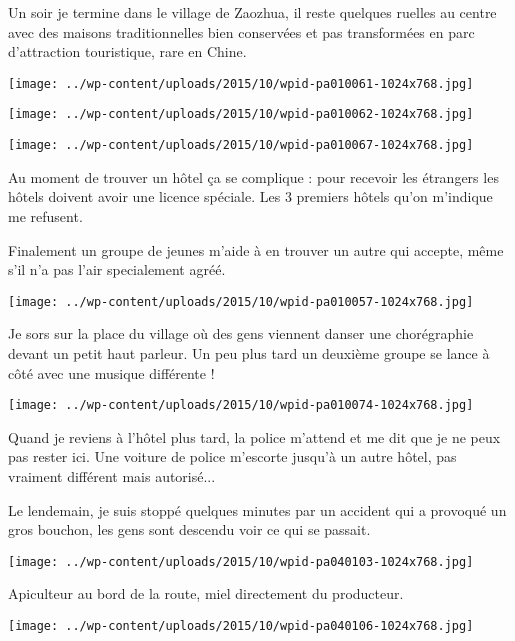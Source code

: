 \pagebreak
 Un soir je termine dans le village de Zaozhua, il reste quelques ruelles au centre avec des maisons traditionnelles bien conservées et pas transformées en parc d'attraction touristique, rare en Chine. 
\begin{center} \texttt{[image: ../wp-content/uploads/2015/10/wpid-pa010061-1024x768.jpg]} \end{center}
\begin{center} \texttt{[image: ../wp-content/uploads/2015/10/wpid-pa010062-1024x768.jpg]} \end{center}
\begin{center} \texttt{[image: ../wp-content/uploads/2015/10/wpid-pa010067-1024x768.jpg]} \end{center}

 Au moment de trouver un hôtel ça se complique : pour recevoir les étrangers les hôtels doivent avoir une licence spéciale. Les 3 premiers hôtels qu'on m'indique me refusent. 

 Finalement un groupe de jeunes m'aide à en trouver un autre qui accepte, même s'il n'a pas l'air specialement agréé.
 \begin{center} \texttt{[image: ../wp-content/uploads/2015/10/wpid-pa010057-1024x768.jpg]} \end{center}

\pagebreak
 Je sors sur la place du village où des gens viennent danser une chorégraphie devant un petit haut parleur. Un peu plus tard un deuxième groupe se lance à côté avec une musique différente ! 
\begin{center} \texttt{[image: ../wp-content/uploads/2015/10/wpid-pa010074-1024x768.jpg]} \end{center}

 Quand je reviens à l'hôtel plus tard, la police m'attend et me dit que je ne peux pas rester ici. Une voiture de police m'escorte jusqu'à un autre hôtel, pas vraiment différent mais autorisé...

  Le lendemain, je suis stoppé quelques minutes par un accident qui a provoqué un gros bouchon, les gens sont descendu voir ce qui se passait. 
\begin{center} \texttt{[image: ../wp-content/uploads/2015/10/wpid-pa040103-1024x768.jpg]} \end{center}

 Apiculteur au bord de la route, miel directement du producteur. 
\begin{center} \texttt{[image: ../wp-content/uploads/2015/10/wpid-pa040106-1024x768.jpg]} \end{center}

